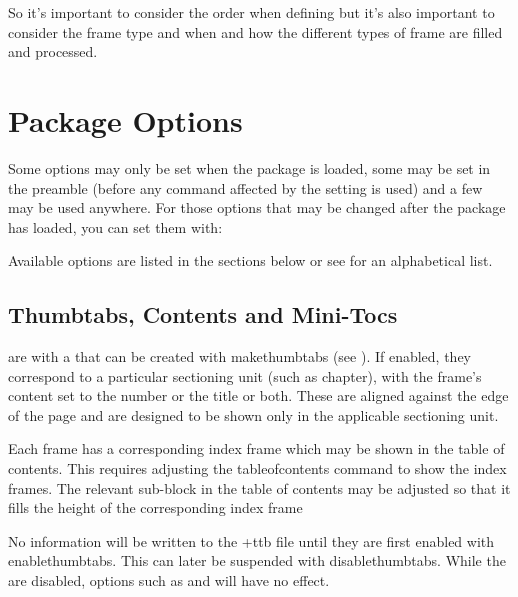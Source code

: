 \documentclass[fontsize=12pt]{scrbook}
\begin{document}
So it's important to consider the order when defining 
but it's also important to consider the frame type and when and how
the different types of \gls{frame} are filled and processed.


\section{Package Options}\label{sec:pkgopts}


Some options may only be set when the package is loaded, some may be
set in the preamble (before any command affected by the setting
is used) and a few may be used anywhere. For those options that may be
changed after the package has loaded, you can set them with:

Available options are listed in the sections below or see
 for an alphabetical list.

\subsection{Thumbtabs, Contents and Mini-Tocs}
\label{sec:pkgoptsthumbtoc}

 are  with a  that can be created with
\gls{makethumbtabs} (see ). If enabled,
they correspond to a particular sectioning unit (such as chapter),
with the frame's content set to the number or the title or both.
These  are aligned against the edge of the page
and are designed to be shown only in the applicable sectioning unit.

Each  frame has a corresponding index frame which may
be shown in the table of contents. This requires adjusting the
\gls{tableofcontents} command to show the index frames. The relevant
sub-block in the table of contents may be adjusted so that it fills
the height of the corresponding  index frame

\begin{important}
No  information will be written to the \ext+{ttb} file 
until they are first enabled with \gls{enablethumbtabs}.
This can later be suspended with \gls{disablethumbtabs}.
While the  are disabled, options such as
 and  will have no effect.
\end{important}
\end{document}
